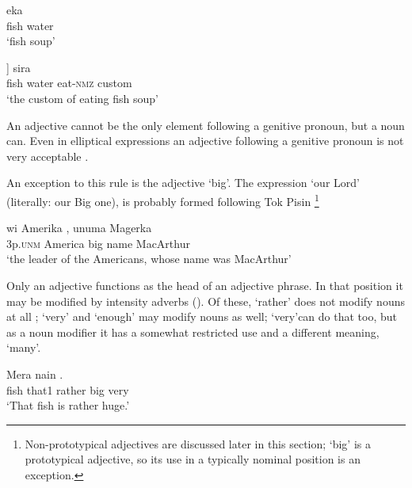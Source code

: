 \ea%
\label{ex:3:x15}
\gll {} eka \\
fish water\\
\glt`fish soup'
\z

\ea%
\label{ex:3:x16}
\gll [[\textstyleEmphasizedVernacularWords{mera} \textstyleEmphasizedVernacularWords{eka}] ] sira \\
\hspaceThis{[[}fish water eat-\textsc{nmz} custom\\
\glt`the custom of eating fish soup'
\z

An adjective cannot be the only element following a genitive pronoun, but a noun can. Even in elliptical expressions an adjective following a genitive pronoun is not very acceptable . 

\z

An exception to this rule is the adjective  `big'. The expression  `our Lord' (literally: our Big one), is probably formed following Tok Pisin \footnote{Non-prototypical adjectives are discussed later in this section; `big' is a prototypical adjective, so its use in a typically nominal position is an exception.} 

\ea%
\label{ex:3:x105}
\gll wi Amerika , unuma Magerka \\
3p.\textsc{unm} America big name MacArthur\\
\glt`the leader of the Americans, whose name was MacArthur'
\z

Only an adjective functions as the head of an adjective phrase. In that position it may be modified by intensity adverbs (). Of these,  `rather' does not modify nouns at all ;  `very' and  `enough' may modify nouns as well;  `very'can do that too, but as a noun modifier it has a somewhat restricted use and a different meaning, `many'.

\ea%
\label{ex:3:x18}
\gll Mera nain   . \\
fish that1 rather big very\\
\glt`That fish is rather huge.'
\z


